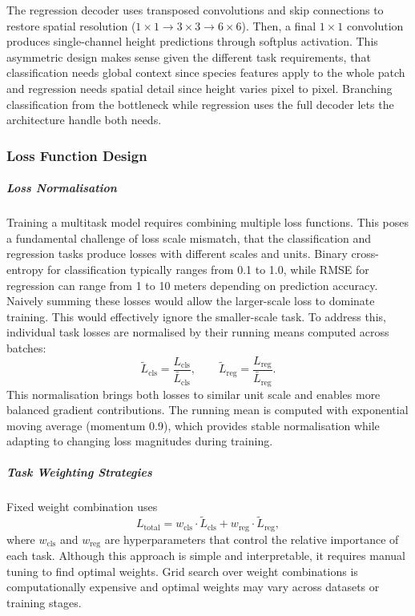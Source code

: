The regression decoder uses transposed convolutions and skip connections to restore spatial resolution ($1\times 1 \rightarrow 3\times 3 \rightarrow 6\times 6$). Then, a final $1\times 1$ convolution produces single-channel height predictions through softplus activation. This asymmetric design makes sense given the different task requirements, that classification needs global context since species features apply to the whole patch and regression needs spatial detail since height varies pixel to pixel. Branching classification from the bottleneck while regression uses the full decoder lets the architecture handle both needs.

\subsubsection{Loss Function Design}

\subparagraph{Loss Normalisation}

Training a multitask model requires combining multiple loss functions. This poses a fundamental challenge of loss scale mismatch, that the classification and regression tasks produce losses with different scales and units. Binary cross-entropy for classification typically ranges from 0.1 to 1.0, while RMSE for regression can range from 1 to 10 meters depending on prediction accuracy. Naively summing these losses would allow the larger-scale loss to dominate training. This would effectively ignore the smaller-scale task. To address this, individual task losses are normalised by their running means computed across batches:
\begin{equation}
    \tilde{L}_{\text{cls}} = \frac{L_{\text{cls}}}{\bar{L}_{\text{cls}}}, \qquad \tilde{L}_{\text{reg}} = \frac{L_{\text{reg}}}{\bar{L}_{\text{reg}}}.
\end{equation}
This normalisation brings both losses to similar unit scale and enables more balanced gradient contributions. The running mean is computed with exponential moving average (momentum 0.9), which provides stable normalisation while adapting to changing loss magnitudes during training.

\subparagraph{Task Weighting Strategies}

Fixed weight combination uses
\begin{equation}
    L_{\text{total}} = w_{\text{cls}} \cdot \tilde{L}_{\text{cls}} + w_{\text{reg}} \cdot \tilde{L}_{\text{reg}},
\end{equation}
where $w_{\text{cls}}$ and $w_{\text{reg}}$ are hyperparameters that control the relative importance of each task. Although this approach is simple and interpretable, it requires manual tuning to find optimal weights. Grid search over weight combinations is computationally expensive and optimal weights may vary across datasets or training stages.

